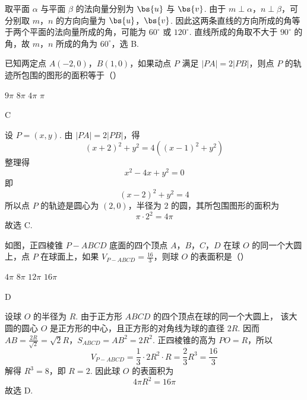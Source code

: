 \begin{solution}
取平面 \(\alpha\) 与平面 \(\beta\) 的法向量分别为 \(\bs{u}\) 与 \(\bs{v}\). 由于
\(m\perp\alpha\)，\(n\perp\beta\)，可分别取 \(m\)，\(n\) 的方向向量为 \(\bs{u}\)，\(\bs{v}\).
因此这两条直线的方向所成的角等于两个平面的法向量所成的角，可能为 \(60^{\circ}\) 或
\(120^{\circ}\). 直线所成的角取不大于 \(90^{\circ}\) 的角，故 \(m\)，\(n\) 所成的角为
\(60^{\circ}\)，选 B.
\end{solution}

\begin{problem}
已知两定点 \(A(-2,0)\)，\(B(1,0)\)，如果动点 \(P\) 满足 \(|PA| = 2|PB|\)，则点 \(P\) 的轨迹所包围的图形的面积等于（\quad）

\choices
    {\(9\pi\)}
    {\(8\pi\)}
    {\(4\pi\)}
    {\(\pi\)}
\end{problem}

\begin{answer}
C
\end{answer}

\begin{solution}
设 \(P=(x,y)\). 由 \(|PA|=2|PB|\)，得
\[
(x+2)^2+y^2=4\left((x-1)^2+y^2\right)
\]
整理得
\[
x^2-4x+y^2=0
\]
即
\[
(x-2)^2+y^2=4
\]
所以点 \(P\) 的轨迹是圆心为 \((2,0)\)，半径为 \(2\) 的圆，其所包围图形的面积为
\[
\pi\cdot2^2=4\pi
\]
故选 C.
\end{solution}

\begin{problem}
如图，正四棱锥 \(P - ABCD\) 底面的四个顶点 \(A\)，\(B\)，\(C\)，\(D\) 在球 \(O\) 的同一个大圆上，点 \(P\) 在球面上，如果 \(V_{P - ABCD} = \frac{16}{3}\)，则球 \(O\) 的表面积是（\quad）


\choices
    {\(4\pi\)}
    {\(8\pi\)}
    {\(12\pi\)}
    {\(16\pi\)}
\end{problem}

\begin{answer}
D
\end{answer}

\begin{solution}
设球 \(O\) 的半径为 \(R\). 由于正方形 \(ABCD\) 的四个顶点在球的同一个大圆上，
该大圆的圆心 \(O\) 是正方形的中心，且正方形的对角线为球的直径 \(2R\). 因而
\(AB=\frac{2R}{\sqrt{2}}=\sqrt{2}R\)，\(S_{ABCD}=AB^2=2R^2\).
正四棱锥的高为 \(PO=R\)，所以
\[
V_{P-ABCD}=\frac{1}{3}\cdot2R^2\cdot R=\frac{2}{3}R^3=\frac{16}{3}
\]
解得 \(R^3=8\)，即 \(R=2\). 因此球 \(O\) 的表面积为
\[
4\pi R^2=16\pi
\]
故选 D.
\end{solution}


